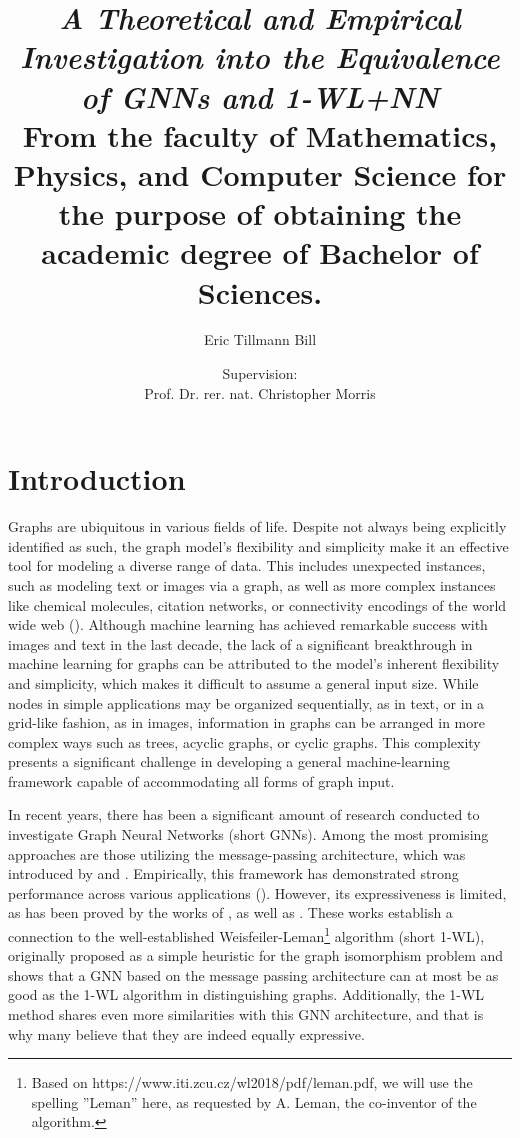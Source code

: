 \documentclass[11pt, dvipsnames, DIV=12]{scrreprt}
\title{\emph{A Theoretical and Empirical Investigation into the Equivalence of GNNs and 1-WL+NN}\\
\vspace{20pt}\small{\normalfont From the faculty of Mathematics, Physics, and Computer Science for the purpose of obtaining the academic degree of Bachelor of Sciences.}
}
\author{Eric Tillmann Bill}
\affil{\vspace{100pt}}
\author{Supervision:\\Prof. Dr. rer. nat. Christopher Morris}
\affil{Informatik 6\\RWTH Aachen University}
\date{\vspace{-30pt}}
\theoremstyle{definition}
\begin{document}
\maketitle
\tableofcontents
\newpage



\section{Introduction}
Graphs are ubiquitous in various fields of life. Despite not always being explicitly identified as such, the graph model's flexibility and simplicity make it an effective tool for modeling a diverse range of data. This includes unexpected instances, such as modeling text or images via a graph, as well as more complex instances like chemical molecules, citation networks, or connectivity encodings of the world wide web (\cite{Mor+2020,Sca+2009}).
Although machine learning has achieved remarkable success with images and text in the last decade, the lack of a significant breakthrough in machine learning for graphs can be attributed to the model's inherent flexibility and simplicity, which makes it difficult to assume a general input size. While nodes in simple applications may be organized sequentially, as in text, or in a grid-like fashion, as in images, information in graphs can be arranged in more complex ways such as trees, acyclic graphs, or cyclic graphs. This complexity presents a significant challenge in developing a general machine-learning framework capable of accommodating all forms of graph input.


In recent years, there has been a significant amount of research conducted to investigate Graph Neural Networks (short GNNs). Among the most promising approaches are those utilizing the message-passing architecture, which was introduced by \cite{Gil+2017} and \cite{Sca+2009}. Empirically, this framework has demonstrated strong performance across various applications (\cite{Kip+2017,Ham+2017,Xu2018}). However, its expressiveness is limited, as has been proved by the works of \cite{Morris2018}, as well as \cite{Xu2018}. These works establish a connection to the well-established Weisfeiler-Leman\footnote{Based on https://www.iti.zcu.cz/wl2018/pdf/leman.pdf, we will use the spelling ''Leman'' here, as requested by A. Leman, the co-inventor of the algorithm.} algorithm (short 1-WL), originally proposed \cite{Wei+1968} as a simple heuristic for the graph isomorphism problem and shows that a GNN based on the message passing architecture can at most be as good as the 1-WL algorithm in distinguishing graphs. Additionally, the 1-WL method shares even more similarities with this GNN architecture, and that is why many believe that they are indeed equally expressive.
\end{document}
